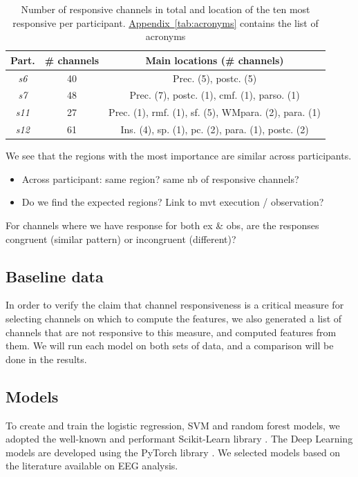 \documentclass[10pt,conference,compsocconf]{IEEEtran}
\newcommand{\aref}[1]{\hyperref[#1]{Appendix~\ref*{#1}}}
\begin{document}
\begin{table}[h!]
    \centering
    \begin{tabular}{| c | c | c |}
        \hline
        Part. & \# channels & Main locations (\# channels) \\
        \hline
        \textit{s6} & 40 & Prec. (5), postc. (5) \\
        \hline
        \textit{s7} & 48 & Prec. (7), postc. (1), cmf. (1), parso. (1) \\
        \hline
        \textit{s11} & 27 & Prec. (1),  rmf. (1), sf. (5), WMpara. (2), para. (1) \\
        \hline
        \textit{s12} & 61 & Ins. (4), sp. (1), pc. (2), para. (1), postc. (2) \\
        \hline
    \end{tabular}
    \caption{Number of responsive channels in total and location of the ten most responsive per participant. \aref{tab:acronyms} contains the list of acronyms}
    \label{tab:actionrecogchannellocations}
\end{table}

We see that the regions with the most importance are similar across participants.

\begin{itemize}
    \item Across participant: same region? same nb of responsive channels?
    \item Do we find the expected regions? Link to mvt execution / observation?
\end{itemize}

For channels where we have response for both ex \& obs, are the responses congruent (similar pattern) or incongruent (different)?

\subsection{Baseline data}
In order to verify the claim that channel responsiveness is a critical measure for selecting channels on which to compute the features, we also generated a list of channels that are not responsive to this measure, and computed features from them. We will run each model on both sets of data, and a comparison will be done in the results.

\subsection{Models}
To create and train the logistic regression, SVM and random forest models, we adopted the well-known and performant Scikit-Learn library \cite{scikitlearn}. The Deep Learning models are developed using the PyTorch library \cite{pytorch}. We selected models based on the literature available on EEG analysis.
\end{document}
